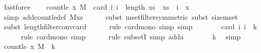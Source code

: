 \begin{isabellebody}
\ fastforce\isanewline
\ \ \isamarkupfalse%
\ {\isachardoublequoteopen}count{\isacharunderscore}{\kern0pt}le\ x\ M\ {\isasymle}\ card\ {\isacharbraceleft}{\kern0pt}i{\isachardot}{\kern0pt}\ i\ {\isacharless}{\kern0pt}\ length\ xs\ {\isasymand}\ xs\ {\isacharbang}{\kern0pt}\ i\ {\isasymle}\ x{\isacharbraceright}{\kern0pt}{\isachardoublequoteclose}\isanewline
\ \ \ \ \isamarkupfalse%
\ {\isacharparenleft}{\kern0pt}simp\ add{\isacharcolon}{\kern0pt}count{\isacharunderscore}{\kern0pt}le{\isacharunderscore}{\kern0pt}def\ M{\isacharunderscore}{\kern0pt}xs{\isacharparenright}{\kern0pt}\isanewline
\ \ \ \ \isamarkupfalse%
\ {\isacharparenleft}{\kern0pt}subst\ mset{\isacharunderscore}{\kern0pt}filter{\isacharbrackleft}{\kern0pt}symmetric{\isacharbrackright}{\kern0pt}{\isacharcomma}{\kern0pt}\ subst\ size{\isacharunderscore}{\kern0pt}mset{\isacharparenright}{\kern0pt}\isanewline
\ \ \ \ \isamarkupfalse%
\ {\isacharparenleft}{\kern0pt}subst\ length{\isacharunderscore}{\kern0pt}filter{\isacharunderscore}{\kern0pt}conv{\isacharunderscore}{\kern0pt}card{\isacharparenright}{\kern0pt}\isanewline
\ \ \ \ \isamarkupfalse%
\ {\isacharparenleft}{\kern0pt}rule\ card{\isacharunderscore}{\kern0pt}mono{\isacharcomma}{\kern0pt}\ simp{\isacharcomma}{\kern0pt}\ simp{\isacharparenright}{\kern0pt}\isanewline
\ \ \isamarkupfalse%
\ \isamarkupfalse%
\ {\isachardoublequoteopen}{\isachardot}{\kern0pt}{\isachardot}{\kern0pt}{\isachardot}{\kern0pt}\ {\isasymle}\ card\ {\isacharbraceleft}{\kern0pt}i{\isachardot}{\kern0pt}\ i\ {\isacharless}{\kern0pt}\ k{\isacharbraceright}{\kern0pt}{\isachardoublequoteclose}\isanewline
\ \ \ \ \isamarkupfalse%
\ {\isacharparenleft}{\kern0pt}rule\ card{\isacharunderscore}{\kern0pt}mono{\isacharcomma}{\kern0pt}\ simp{\isacharparenright}{\kern0pt}\isanewline
\ \ \ \ \isamarkupfalse%
\ {\isacharparenleft}{\kern0pt}rule\ subsetI{\isacharcomma}{\kern0pt}\ simp\ add{\isacharcolon}{\kern0pt}a{\isacharparenright}{\kern0pt}\isanewline
\ \ \isamarkupfalse%
\ \isamarkupfalse%
\ {\isachardoublequoteopen}{\isachardot}{\kern0pt}{\isachardot}{\kern0pt}{\isachardot}{\kern0pt}\ {\isacharequal}{\kern0pt}\ k{\isachardoublequoteclose}\ \isamarkupfalse%
\ simp\isanewline
\ \ \isamarkupfalse%
\ \isamarkupfalse%
\ {\isachardoublequoteopen}count{\isacharunderscore}{\kern0pt}le\ x\ M\ {\isasymle}\ k{\isachardoublequoteclose}\ \isamarkupfalse%

\end{isabellebody}

